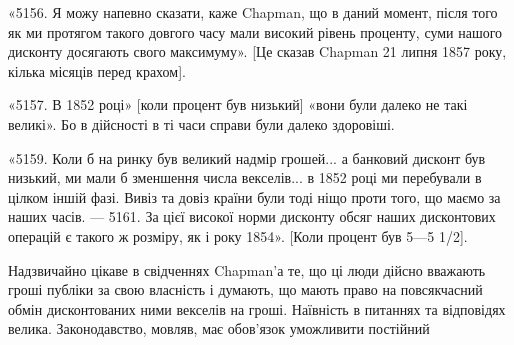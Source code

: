 «5156. Я можу напевно сказати, каже Chapman, що в даний момент, після
того як ми протягом такого довгого часу мали високий рівень проценту, суми
нашого дисконту досягають свого максимуму». [Це сказав Chapman 21 липня
1857 року, кілька місяців перед крахом].

«5157. В 1852 році» [коли процент був низький] «вони були далеко не
такі великі». Бо в дійсності в ті часи справи були далеко здоровіші.

«5159. Коли б на ринку був великий надмір грошей... а банковий дисконт
був низький, ми мали б зменшення числа векселів... в 1852 році ми
перебували в цілком іншій фазі. Вивіз та довіз країни були тоді ніщо проти
того, що маємо за наших часів. — 5161. За цієї високої норми дисконту обсяг
наших дисконтових операцій є такого ж розміру, як і року 1854». [Коли процент
був 5—5 1/2].

Надзвичайно цікаве в свідченнях Chapman’а те, що ці люди дійсно вважають
гроші публіки за свою власність і думають, що мають право на повсякчасний
обмін дисконтованих ними векселів на гроші. Наївність в питаннях
та відповідях велика. Законодавство, мовляв, має обов’язок уможливити постійний
\parbreak{}  %
